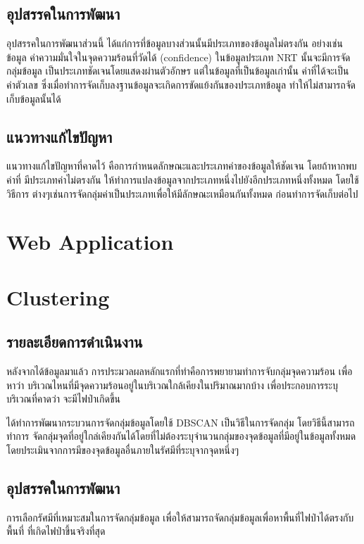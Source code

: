 \documentclass{report}
\begin{document}
\subsection{อุปสรรคในการพัฒนา}
อุปสรรคในการพัฒนาส่วนนี้ ได้แก่การที่ข้อมูลบางส่วนนั้นมีประเภทของข้อมูลไม่ตรงกัน อย่างเช่นข้อมูล%
ค่าความมั่นใจในจุดความร้อนที่วัดได้ (confidence) ในข้อมูลประเภท NRT นั้นจะมีการจัดกลุ่มข้อมูล%
เป็นประเภทชัดเจนโดยแสดงผ่านตัวอักษร แต่ในข้อมูลที่เป็นข้อมูลเก่านั้น ค่าที่ได้จะเป็นค่าตัวเลข 
ซึ่งเมื่อทำการจัดเก็บลงฐานข้อมูลจะเกิดการขัดแย้งกันของประเภทข้อมูล ทำให้ไม่สามารถจัดเก็บข้อมูลนั้นได้

\subsection{แนวทางแก้ไขปัญหา}
แนวทางแก้ไขปัญหาที่คาดไว้ คือการกำหนดลักษณะและประเภทค่าของข้อมูลให้ชัดเจน โดยถ้าหากพบค่าที่%
มีประเภทค่าไม่ตรงกัน ให้ทำการแปลงข้อมูลจากประเภทหนึ่งไปยังอีกประเภทหนึ่งทั้งหมด โดยใช้วิธีการ%
ต่างๆเช่นการจัดกลุ่มค่าเป็นประเภทเพื่อให้มีลักษณะเหมือนกันทั้งหมด ก่อนทำการจัดเก็บต่อไป

\section{Web Application}

\section{Clustering}
\subsection{รายละเอียดการดำเนินงาน}
หลังจากได้ข้อมูลมาแล้ว การประมวลผลหลักแรกที่ทำคือการพยายามทำการจับกลุ่มจุดความร้อน เพื่อหาว่า%
บริเวณไหนที่มีจุดความร้อนอยู่ในบริเวณใกล้เคียงในปริมาณมากบ้าง เพื่อประกอบการระบุบริเวณที่คาดว่า%
จะมีไฟป่าเกิดขึ้น

ได้ทำการพัฒนากระบวนการจัดกลุ่มข้อมูลโดยใช้ DBSCAN เป็นวิธีในการจัดกลุ่ม โดยวิธีนี้สามารถทำการ%
จัดกลุ่มจุดที่อยู่ใกล่เคียงกันได้โดยที่ไม่ต้องระบุจำนวนกลุ่มของจุดข้อมูลที่มีอยู่ในข้อมูลทั้งหมด
โดยประเมินจากการมีของจุดข้อมูลอื่นภายในรัศมีที่ระบุจากจุดหนึ่งๆ

\subsection{อุปสรรคในการพัฒนา}
การเลือกรัศมีที่เหมาะสมในการจัดกลุ่มข้อมูล เพื่อให้สามารถจัดกลุ่มข้อมูลเพื่อหาพื้นที่ไฟป่าได้ตรงกับพื้นที่%
ที่เกิดไฟป่าขึ้นจริงที่สุด
\end{document}
